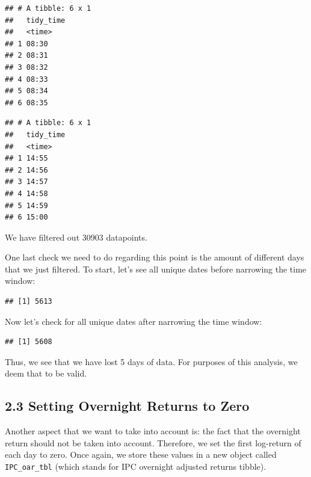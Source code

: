 \documentclass[]{elsarticle} %
\begin{document}
\begin{verbatim}
## # A tibble: 6 x 1
##   tidy_time
##   <time>   
## 1 08:30    
## 2 08:31    
## 3 08:32    
## 4 08:33    
## 5 08:34    
## 6 08:35
\end{verbatim}

\begin{verbatim}
## # A tibble: 6 x 1
##   tidy_time
##   <time>   
## 1 14:55    
## 2 14:56    
## 3 14:57    
## 4 14:58    
## 5 14:59    
## 6 15:00
\end{verbatim}

We have filtered out 30903 datapoints.

One last check we need to do regarding this point is the amount of
different days that we just filtered. To start, let's see all unique
dates before narrowing the time window:

\begin{verbatim}
## [1] 5613
\end{verbatim}

Now let's check for all unique dates after narrowing the time window:

\begin{verbatim}
## [1] 5608
\end{verbatim}

Thus, we see that we have lost 5 days of data. For purposes of this
analysis, we deem that to be valid.

\hypertarget{setting-overnight-returns-to-zero}{%
\subsection{2.3 Setting Overnight Returns to
Zero}\label{setting-overnight-returns-to-zero}}

Another aspect that we want to take into account is: the fact that the
overnight return should not be taken into account. Therefore, we set the
first log-return of each day to zero. Once again, we store these values
in a new object called \texttt{IPC\_oar\_tbl} (which stands for IPC
overnight adjusted returns tibble).
\end{document}
